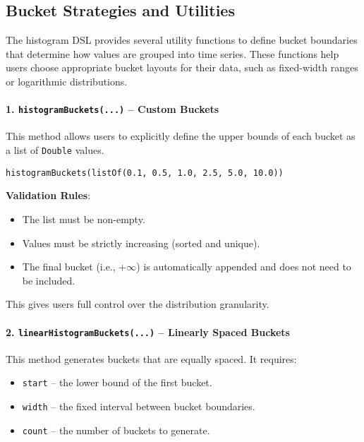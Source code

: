 \subsection{Bucket Strategies and Utilities}

The histogram DSL provides several utility functions to define bucket boundaries that determine how values are grouped into time series. These functions help users choose appropriate bucket layouts for their data, such as fixed-width ranges or logarithmic distributions.

\paragraph{1. \texttt{histogramBuckets(...)} – Custom Buckets}

This method allows users to explicitly define the upper bounds of each bucket as a list of \texttt{Double} values.

\begin{verbatim}
histogramBuckets(listOf(0.1, 0.5, 1.0, 2.5, 5.0, 10.0))
\end{verbatim}

\textbf{Validation Rules}:
\begin{itemize}
    \item The list must be non-empty.
    \item Values must be strictly increasing (sorted and unique).
    \item The final bucket (i.e., +\(\infty\)) is automatically appended and does not need to be included.
\end{itemize}

This gives users full control over the distribution granularity.

\paragraph{2. \texttt{linearHistogramBuckets(...)} – Linearly Spaced Buckets}

This method generates buckets that are equally spaced. It requires:

\begin{itemize}
    \item \texttt{start} – the lower bound of the first bucket.
    \item \texttt{width} – the fixed interval between bucket boundaries.
    \item \texttt{count} – the number of buckets to generate.
\end{itemize}

